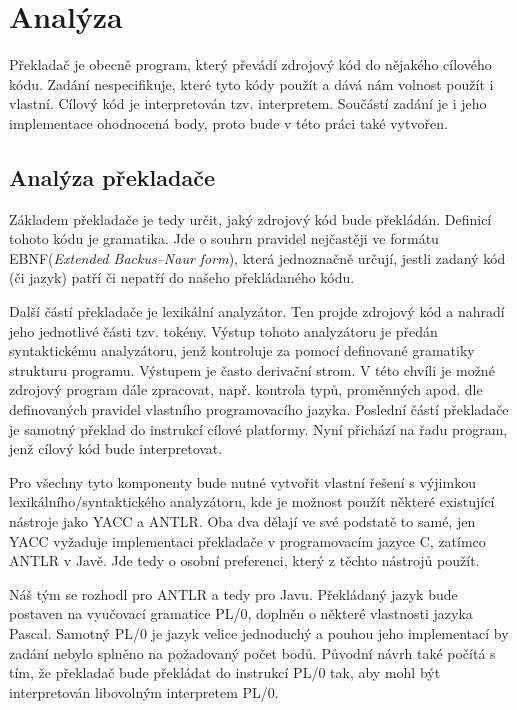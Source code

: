 \documentclass[
12pt,
a4paper,
pdftex,
czech,
titlepage
]{report}
\begin{document}
\chapter{Analýza}

Překladač je obecně program, který převádí zdrojový kód do nějakého cílového kódu. Zadání nespecifikuje, které tyto kódy použít a dává nám volnost použít i vlastní. Cílový kód je interpretován tzv. interpretem. Součástí zadání je i jeho implementace ohodnocená body, proto bude v této práci také vytvořen.

\section{Analýza překladače}

Základem překladače je tedy určit, jaký zdrojový kód bude překládán. Definicí tohoto kódu je gramatika. Jde o souhrn pravidel nejčastěji ve formátu EBNF(\textit{Extended Backus–Naur form}), která jednoznačně určují, jestli zadaný kód (či jazyk) patří či nepatří do našeho překládaného kódu. 

Další částí překladače je lexikální analyzátor. Ten projde zdrojový kód a nahradí jeho jednotlivé části tzv. tokény. Výstup tohoto analyzátoru je předán syntaktickému analyzátoru, jenž kontroluje za pomocí definované gramatiky strukturu programu. Výstupem je často derivační strom. V této chvíli je možné zdrojový program dále zpracovat, např. kontrola typů, proměnných apod. dle definovaných pravidel vlastního programovacího jazyka. Poslední částí překladače je samotný překlad do instrukcí cílové platformy. Nyní přichází na řadu program, jenž cílový kód bude interpretovat.

Pro všechny tyto komponenty bude nutné vytvořit vlastní řešení s výjimkou lexikálního/syntaktického analyzátoru, kde je možnost použít některé existující nástroje jako YACC a ANTLR. Oba dva dělají ve své podstatě to samé, jen YACC vyžaduje implementaci překladače v programovacím jazyce C, zatímco ANTLR v Javě. Jde tedy o osobní preferenci, který z těchto nástrojů použít.

Náš tým se rozhodl pro ANTLR a tedy pro Javu. Překládaný jazyk bude postaven na vyučovací gramatice PL/0, doplněn o některé vlastnosti jazyka Pascal. Samotný PL/0 je jazyk velice jednoduchý a pouhou jeho implementací by zadání nebylo splněno na požadovaný počet bodů. Původní návrh také počítá s tím, že překladač bude překládat do instrukcí PL/0 tak, aby mohl být interpretován libovolným interpretem PL/0. 
\end{document}
